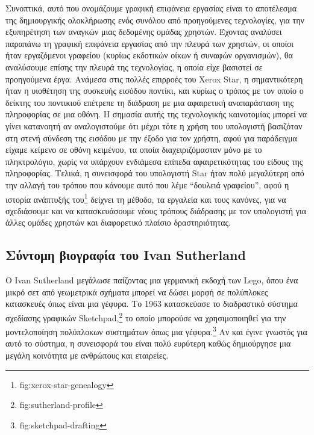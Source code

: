 \documentclass[
]{article}
\begin{document}
Συνοπτικά, αυτό που ονομάζουμε γραφική επιφάνεια εργασίας είναι το
αποτέλεσμα της δημιουργικής ολοκλήρωσης ενός συνόλου από προηγούμενες
τεχνολογίες, για την εξυπηρέτηση των αναγκών μιας δεδομένης ομάδας
χρηστών. Έχοντας αναλύσει παραπάνω τη γραφική επιφάνεια εργασίας από την
πλευρά των χρηστών, οι οποίοι ήταν εργαζόμενοι γραφείου (κυρίως
εκδοτικών οίκων ή συναφών οργανισμών), θα αναλύσουμε επίσης την πλευρά
της τεχνολογίας, η οποία είχε βασιστεί σε προηγούμενα έργα. Ανάμεσα στις
πολλές επιρροές του Xerox Star, η σημαντικότερη ήταν η υιοθέτηση της
συσκευής εισόδου ποντίκι, και κυρίως ο τρόπος με τον οποίο ο δείκτης του
ποντικιού επέτρεπε τη διάδραση με μια αφαιρετική αναπαράσταση της
πληροφορίας σε μια οθόνη. Η σημασία αυτής της τεχνολογικής καινοτομίας
μπορεί να γίνει κατανοητή αν αναλογιστούμε ότι μέχρι τότε η χρήση του
υπολογιστή βασιζόταν στη στενή σύνδεση της εισόδου με την έξοδο για τον
χρήστη, αφού για παράδειγμα είχαμε κείμενο σε οθόνη κειμένου, τα οποία
διαχειριζόμασταν μόνο με το πληκτρολόγιο, χωρίς να υπάρχουν ενδιάμεσα
επίπεδα αφαιρετικότητας του είδους της πληροφορίας. Τελικά, η συνεισφορά
του υπολογιστή Star ήταν πολύ μεγαλύτερη από την αλλαγή του τρόπου που
κάνουμε αυτό που λέμε ``δουλειά γραφείου'', αφού η ιστορία ανάπτυξής
του\footnote{fig:xerox-star-genealogy} δείχνει τη μέθοδο, τα εργαλεία
και τους κανόνες, για να σχεδιάσουμε και να κατασκευάσουμε νέους τρόπους
διάδρασης με τον υπολογιστή για άλλες ομάδες χρηστών και διαφορετικό
πλαίσιο δραστηριότητας.

\hypertarget{ux3c3ux3cdux3bdux3c4ux3bfux3bcux3b7-ux3b2ux3b9ux3bfux3b3ux3c1ux3b1ux3c6ux3afux3b1-ux3c4ux3bfux3c5-ivan-sutherland}{%
\subsection{Σύντομη βιογραφία του Ivan
Sutherland}\label{ux3c3ux3cdux3bdux3c4ux3bfux3bcux3b7-ux3b2ux3b9ux3bfux3b3ux3c1ux3b1ux3c6ux3afux3b1-ux3c4ux3bfux3c5-ivan-sutherland}}

Ο Ivan Sutherland μεγάλωσε παίζοντας μια γερμανική εκδοχή των Lego, όπου
ένα μικρό σετ από γεωμετρικά σχήματα μπορεί να δώσει μορφή σε πολύπλοκες
κατασκευές όπως είναι μια γέφυρα. Το 1963 κατασκεύασε το διαδραστικό
σύστημα σχεδίασης γραφικών Sketchpad,\footnote{fig:sutherland-profile}
το οποίο μπορούσε να χρησιμοποιηθεί για την μοντελοποίηση πολύπλοκων
συστημάτων όπως μια γέφυρα.\footnote{fig:sketchpad-drafting} Αν και
έγινε γνωστός για αυτό το σύστημα, η συνεισφορά του είναι πολύ ευρύτερη
καθώς δημιούργησε μια μεγάλη κοινότητα με ανθρώπους και εταιρείες.
\end{document}

